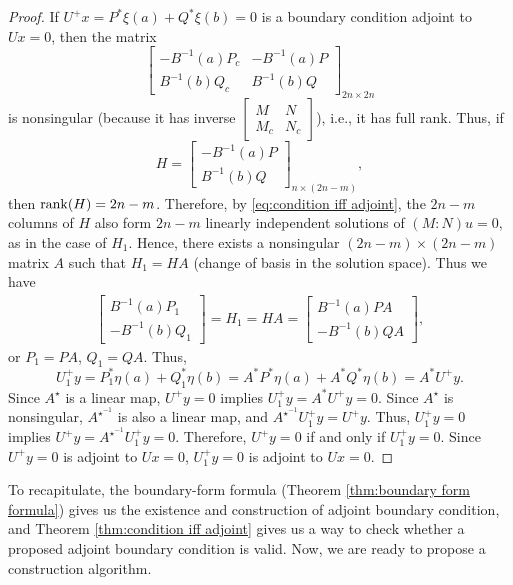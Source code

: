 \documentclass[11pt, oneside, a4paper]{article}
\begin{document}
\begin{proof}
    If $U^+x=P^*\xi(a) + Q^*\xi(b)=0$ is a boundary condition adjoint to $Ux=0$, then the matrix
    \[\begin{bmatrix}
        -B^{-1}(a)P_c & -B^{-1}(a)P\\
        B^{-1}(b)Q_c & B^{-1}(b)Q
    \end{bmatrix}_{2n\times 2n}\]
is nonsingular (because it has inverse $\begin{bmatrix}M & N\\ M_c & N_c\end{bmatrix}$), i.e., it has full rank. Thus, if 
    \[H = \begin{bmatrix}
        -B^{-1}(a)P\\
        B^{-1}(b)Q
    \end{bmatrix}_{n\times (2n-m)},\]
    then $\operatorname{rank}(H)=2n-m$. Therefore, by \eqref{eq:condition iff adjoint}, the $2n-m$ columns of $H$ also form $2n-m$ linearly independent solutions of $(M:N)u=0$, as in the case of $H_1$. Hence, there exists a nonsingular $(2n-m)\times (2n-m)$ matrix $A$ such that $H_1=HA$ (change of basis in the solution space). 
    Thus we have
    \begin{align*}
        \begin{bmatrix}
            B^{-1}(a)P_1\\
            -B^{-1}(b)Q_1
        \end{bmatrix} = H_1 = HA = \begin{bmatrix}
            B^{-1}(a)PA\\
            -B^{-1}(b)QA
        \end{bmatrix},
    \end{align*}
    or $P_1=PA$, $Q_1=QA$. Thus, 
    \[U_1^+y = P_1^*\eta(a) + Q_1^*\eta(b) = A^*P^*\eta(a) + A^*Q^*\eta(b)= A^* U^+y.\]
    Since $A^\star$ is a linear map, $U^+y=0$ implies $U_1^+y=A^*U^+y=0$. Since $A^\star$ is nonsingular, $A^{\star^{-1}}$ is also a linear map, and $A^{\star^{-1}}U_1^+y = U^+y$. Thus, $U_1^+y=0$ implies $U^+y=A^{\star^{-1}}U_1^+y=0$. Therefore, $U^+y=0$ if and only if $U_1^+y=0$. Since $U^+y=0$ is adjoint to $Ux=0$, $U_1^+y=0$ is adjoint to $Ux=0$.
\end{proof}

To recapitulate, the boundary-form formula (Theorem \ref{thm:boundary form formula}) gives us the existence and construction of adjoint boundary condition, and Theorem \ref{thm:condition iff adjoint} gives us a way to check whether a proposed adjoint boundary condition is valid. Now, we are ready to propose a construction algorithm.
\end{document}
